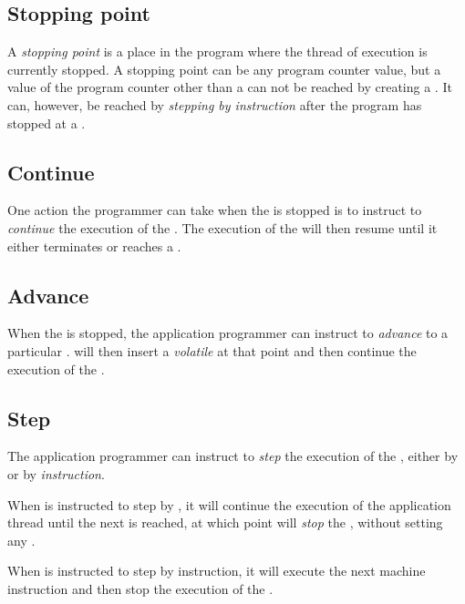 %
\def\Stoppingpoint{Stopping point}%
\def\stoppingpoint{stopping point}%
\def\stoppingpoints{stopping points}%
\subsection{\Stoppingpoint{}}

A \emph{\stoppingpoint{}} is a place in the program where the thread
of execution is currently stopped.  A \stoppingpoint{} can be any
program counter value, but a value of the program counter other than
a \pollpoint{} can not be reached by creating a \breakpoint{}.  It
can, however, be reached by \emph{stepping by instruction} after the
program has stopped at a \pollpoint{}.

%
\def\Continue{Continue}%
\def\continue{continue}%
\def\continues{continues}%
\subsection{\Continue{}}

One action the programmer can take when the \applicationthread{} is
stopped is to instruct \sysname{} to \emph{\continue{}} the execution
of the \applicationthread{}.  The execution of the
\applicationthread{} will then resume until it either terminates or
reaches a \breakpoint{}.

%
\def\Dvance{Advance}%
\def\dvance{advance}%
\def\dvances{advances}%
\subsection{\Dvance{}}

When the \applicationthread{} is stopped, the application programmer
can instruct \sysname{} to \emph{\dvance{}} to a particular
\pollpoint{}.  \sysname{} will then insert a \emph{volatile
  \breakpoint{}} at that point and then \continue{} the execution of
the \applicationthread{}.

%
\def\Step{Step}%
\def\step{step}%
\def\steps{steps}%
\subsection{\Step{}}

The application programmer can instruct \sysname{} to \emph{\step{}}
the execution of the \applicationthread{}, either by \emph{\pollpoint}
or by \emph{instruction}.  

When \sysname{} is instructed to \step{} by \pollpoint{}, it will
continue the execution of the application thread until the next
\pollpoint{} is reached, at which point \sysname{} will \emph{stop}
the \applicationthread{}, without setting any \breakpoint{}. 

When \sysname{} is instructed to \step{} by instruction, it will
execute the next machine instruction and then stop the execution of
the \applicationthread{}.
